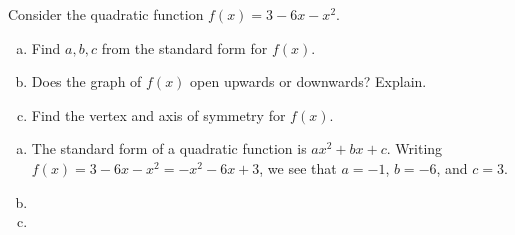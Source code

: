 \documentclass[11pt,letterpaper]{article}
\begin{document}

\problem Consider the quadratic function $f(x)= 3 - 6x - x^2$.
	\begin{enumerate}[(a)]
	\item Find $a, b, c$ from the standard form for $f(x)$.
	\item Does the graph of $f(x)$ open upwards or downwards? Explain.
	\item Find the vertex and axis of symmetry for $f(x)$.
	\end{enumerate} \pspace

\sol 
\begin{enumerate}[(a)]
\item The standard form of a quadratic function is $ax^2 + bx + c$. Writing $f(x)= 3 - 6x - x^2= -x^2 - 6x + 3$, we see that $a= -1$, $b= -6$, and $c= 3$. \pspace

\item 
\item 
\end{enumerate}
\end{document}
